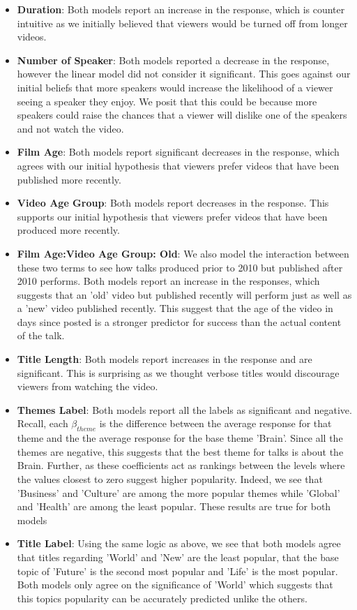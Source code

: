 \begin{itemize}
	\item \textbf{Duration}: Both models report an increase in the response, which is counter intuitive as we initially believed that viewers would be turned off from longer videos.
	\item \textbf{Number of Speaker}: Both models reported a decrease in the response, however the linear model did not consider it significant. This goes against our initial beliefs that more speakers would increase the likelihood of a viewer seeing a speaker they enjoy. We posit that this could be because more speakers could raise the chances that a viewer will dislike one of the speakers and not watch the video.
	\item \textbf{Film Age}: Both models report significant decreases in the response, which agrees with our initial hypothesis that viewers prefer videos that have been published more recently. 
	\item \textbf{Video Age Group}: Both models report decreases in the response. This supports our initial hypothesis that viewers prefer videos that have been produced more recently.
	\item \textbf{Film Age:Video Age Group: Old}: We also model the interaction between these two terms to see how talks produced prior to 2010 but published after 2010 performs. Both models report an increase in the responses, which suggests that an 'old' video but published recently will perform just as well as a 'new' video published recently. This suggest that the age of the video in days since posted is a stronger predictor for success than the actual content of the talk. 
	\item \textbf{Title Length}: Both models report increases in the response and are significant. This is surprising as we thought verbose titles would discourage viewers from watching the video. 
	\item \textbf{Themes Label}: Both models report all the labels as significant and negative. Recall, each $\beta_{theme}$ is the difference between the average response for that theme and the the average response for the base theme 'Brain'. Since all the themes are negative, this suggests that the best theme for talks is about the Brain. Further, as these coefficients act as rankings between the levels where the values closest to zero suggest higher popularity. Indeed, we see that 'Business' and 'Culture' are among the more popular themes while 'Global' and 'Health' are among the least popular. These results are true for both models
	\item \textbf{Title Label}: Using the same logic as above, we see that both models agree that titles regarding 'World' and 'New' are the least popular, that the base topic of 'Future' is the second most popular and 'Life' is the most popular. Both models only agree on the significance of 'World' which suggests that this topics popularity can be accurately predicted unlike the others.
\end{itemize}

